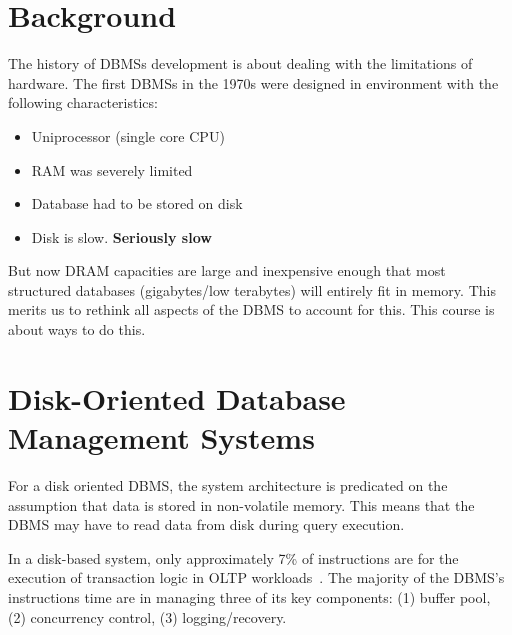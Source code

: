 \documentclass[11pt]{article}
\begin{document}
\maketitle
\thispagestyle{plain}

\section{Background}
The history of DBMSs development is about dealing with the limitations of hardware.
The first DBMSs in the 1970s were designed in environment with the following characteristics:
\begin{itemize}
    \item Uniprocessor (single core CPU)
    \item RAM was severely limited
    \item Database had to be stored on disk
    \item Disk is slow. \textbf{Seriously slow}
\end{itemize}
   
But now DRAM capacities are large and inexpensive enough that most structured databases 
(gigabytes/low terabytes) will entirely fit in memory. This merits us to rethink all aspects of 
the DBMS to account for this. This course is about ways to 
do this.

\section{Disk-Oriented Database Management Systems}
For a disk oriented DBMS, the system architecture is predicated on the assumption that data 
is stored in non-volatile memory. This means that the DBMS may have to read data from disk during 
query execution.

In a disk-based system, only approximately 7\% of instructions are for the execution of 
transaction logic in OLTP workloads~\cite{harizopoulos08}. The majority of the DBMS's 
instructions time are in managing 
three of its key components: (1) buffer pool, (2) concurrency control, (3) logging/recovery.

\end{document}
